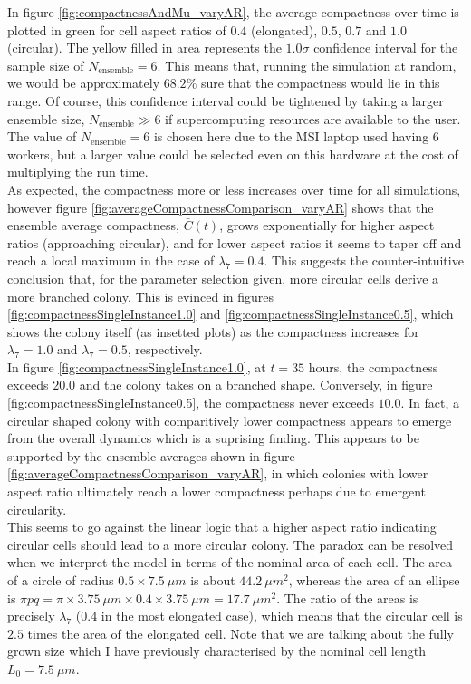 In figure \ref{fig:compactnessAndMu_varyAR}, the average compactness over time 
is plotted in green for cell aspect ratios of $0.4$ (elongated), $0.5$, $0.7$ and $1.0$ (circular). 
The yellow filled in area represents the $1.0 \sigma$ confidence interval for the sample 
size of $N_{\textrm{ensemble}} = 6$. This means that, running the simulation at random,
we would be approximately $68.2 \%$ sure that the compactness would lie in this range.
Of course, this confidence interval could be tightened by 
taking a larger ensemble size, $N_{\textrm{ensemble}} \gg 6$ if supercomputing 
resources are available to the user. The value of $N_{\textrm{ensemble}} = 6$ is chosen 
here due to the MSI laptop used having $6$ workers, but a larger value could 
be selected even on this hardware at the cost of multiplying the run time.
\\

As expected, the compactness more or less increases over time for all simulations, 
however figure \ref{fig:averageCompactnessComparison_varyAR} shows that the ensemble average
compactness,
$\bar{C}(t)$, grows exponentially for higher aspect ratios (approaching circular), 
and for lower aspect ratios it seems to taper off and reach a local maximum 
in the case of $\lambda_7 = 0.4$. This suggests the counter-intuitive
conclusion that, for the parameter selection given, more circular cells 
derive a more branched colony. This is 
evinced in figures \ref{fig:compactnessSingleInstance1.0} and 
\ref{fig:compactnessSingleInstance0.5}, which shows 
the colony itself (as insetted plots) as the compactness increases for 
$\lambda_7 = 1.0$ and $\lambda_7 = 0.5$, respectively. 
\\

In figure \ref{fig:compactnessSingleInstance1.0}, 
at $t = 35$ hours, the compactness exceeds $20.0$ and 
the colony takes on a branched shape. Conversely, in figure \ref{fig:compactnessSingleInstance0.5}, 
the compactness never exceeds $10.0$. In fact, 
a circular shaped colony with comparitively lower compactness appears 
to emerge from the overall dynamics which is a suprising finding. 
This appears to be supported by the ensemble averages shown in figure 
\ref{fig:averageCompactnessComparison_varyAR}, in which
colonies with lower aspect ratio ultimately
reach a lower compactness perhaps due to emergent circularity.
\\

This seems to go against the linear logic that a higher aspect ratio indicating circular cells 
should lead to a more circular colony. The paradox can be resolved 
when we interpret the model in terms of the nominal area of each cell. 
The area of a circle of radius $0.5 \times 7.5 \ \mu m$ is about $44.2 \ \mu m^2$,
whereas the area of an ellipse is $\pi pq = \pi \times 3.75 \ \mu m \times 0.4 \times 3.75 \ \mu m =
17.7 \ \mu m^2$. The ratio of the areas is precisely $\lambda_7$ ($0.4$ in the most elongated case), which 
means that the circular cell is $2.5$ times the area of the elongated cell.
Note that we are talking about the fully grown size which I have previously characterised
by the nominal cell length $L_0 = 7.5 \ \mu m$.
\\

